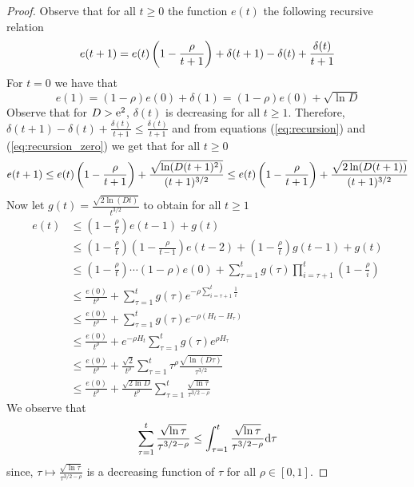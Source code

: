 \begin{proof}
  Observe that for all $t\geq 0$ the function $e(t)$ the following recursive
  relation
  \begin{equation}\label{eq:recursion}
    e(t+1) = e(t) \left(1 - \frac{\rho}{t+1} \right)
    + \delta(t+1)-\delta(t) + \frac{\delta(t)}{t+1}\\
  \end{equation}
  For $t=0$ we have that
  \begin{equation}\label{eq:recursion_zero}
    e(1) = (1- \rho)e(0) + \delta(1) = (1 -\rho)e(0) + \sqrt{\ln D}
  \end{equation}
  Observe that for $D>\mathrm{e}^2$, $\delta(t)$ is decreasing for all $t\geq 1$.
  Therefore, \(
    \delta(t+1)-\delta(t) + \frac{\delta(t)}{t+1}\leq \frac{\delta(t)}{t+1} \)
  and from equations (\ref{eq:recursion}) and (\ref{eq:recursion_zero})
  we get that for all $t\geq 0$
  \[
    e(t+1) \leq
    e(t) \left(1 - \frac{\rho}{t+1} \right) +
    \frac{\sqrt{\ln(D (t+1)^2)}}{(t+1)^{3/2}}
    \leq
    e(t) \left(1 - \frac{\rho}{t+1} \right) +
    \frac{\sqrt{2 \ln(D (t+1))}}{(t+1)^{3/2}}
  \]
  Now let \(g(t) = \frac{\sqrt{2 \ln(D t)}}{t^{3/2}} \) to obtain
  for all $t\geq 1$
  \begin{align*}
    e(t)
    &\leq
    (1-\frac{\rho}{t})e(t-1) + g(t)\\
    &\leq
    (1-\frac{\rho}{t})(1-\frac{\rho}{t-1})e(t-2)
    + (1-\frac{\rho}{t})g(t-1) + g(t)\\
    &\leq
    (1-\frac{\rho}{t})\cdots (1-\rho)e(0)
    + \sum_{\tau=1}^t g(\tau)\prod_{i=\tau+1}^t(1-\frac{\rho}{i})\\
    &\leq
    \frac{e(0)}{t^\rho}
    + \sum_{\tau=1}^tg(\tau)e^{-\rho\sum_{i=\tau+1}^t\frac{1}{i}}\\
    &\leq
    \frac{e(0)}{t^\rho}
    + \sum_{\tau=1}^tg(\tau)e^{-\rho(H_t-H_{\tau})}\\
    &\leq
    \frac{e(0)}{t^\rho}
    + e^{-\rho H_t}\sum_{\tau=1}^tg(\tau)e^{\rho H_{\tau}}\\
    &\leq
    \frac{e(0)}{t^\rho}
    + \frac{\sqrt{2}}{t^\rho}
    \sum_{\tau=1}^t\tau^\rho\frac{\sqrt{\ln (D \tau)}}{\tau^{3/2}}\\
    &\leq
    \frac{e(0)}{t^\rho}
    + \frac{\sqrt{2 \ln D }}{t^\rho}
    \sum_{\tau=1}^t\frac{\sqrt{\ln \tau}}{\tau^{3/2-\rho}}
  \end{align*}
  We observe that
  \begin{equation}\label{eq:integral_upper_bound}
    \sum_{\tau=1}^t
    \frac{\sqrt{\ln \tau}}{\tau^{3/2-\rho}}
    \leq
    \int_{\tau=1}^t \frac{\sqrt{\ln\tau}}{\tau^{3/2-\rho}}\mathrm{d} \tau
  \end{equation}
  since, \(\tau \mapsto \frac{\sqrt{\ln\tau}}{\tau^{3/2-\rho}}\)
  is a decreasing function of $\tau$ for all $\rho \in[0,1]$.


\end{proof}
